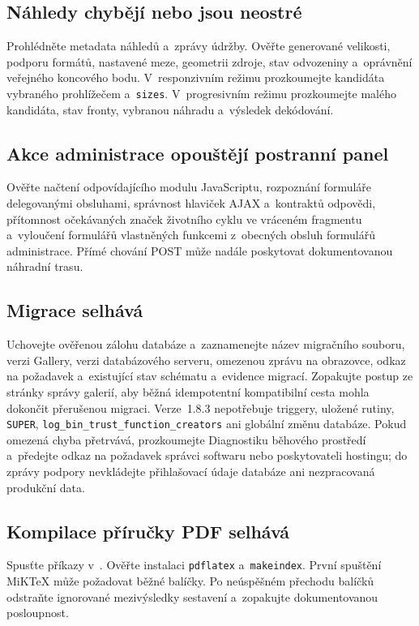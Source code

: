 \documentclass[11pt,a4paper]{article}
\newcommand{\version}{1.8.3}
\newcommand{\filepath}[1]{\path{#1}}
\newcommand{\codeword}[1]{\nolinkurl{#1}}
\begin{document}
\subsection{Náhledy chybějí nebo jsou neostré}

Prohlédněte metadata náhledů a~zprávy údržby. Ověřte generované velikosti,
podporu formátů, nastavené meze, geometrii zdroje, stav odvozeniny a~oprávnění
veřejného koncového bodu. V~responzivním režimu prozkoumejte kandidáta vybraného
prohlížečem a~\codeword{sizes}. V~progresivním režimu prozkoumejte malého
kandidáta, stav fronty, vybranou náhradu a~výsledek dekódování.

\subsection{Akce administrace opouštějí postranní panel}

Ověřte načtení odpovídajícího modulu JavaScriptu, rozpoznání formuláře
delegovanými obsluhami, správnost hlaviček AJAX a~kontraktů odpovědi, přítomnost
očekávaných značek životního cyklu ve vráceném fragmentu a~vyloučení formulářů
vlastněných funkcemi z~obecných obsluh formulářů administrace. Přímé chování
POST může nadále poskytovat dokumentovanou náhradní trasu.

\subsection{Migrace selhává}

Uchovejte ověřenou zálohu databáze a~zaznamenejte název migračního souboru,
verzi Gallery, verzi databázového serveru, omezenou zprávu na obrazovce, odkaz
na požadavek a~existující stav schématu a~evidence migrací. Zopakujte postup ze
stránky správy galerií, aby běžná idempotentní kompatibilní cesta mohla dokončit
přerušenou migraci. Verze~\version{} nepotřebuje triggery, uložené rutiny,
\codeword{SUPER}, \codeword{log\_bin\_trust\_function\_creators} ani globální
změnu databáze. Pokud omezená chyba přetrvává, prozkoumejte Diagnostiku běhového
prostředí a~předejte odkaz na požadavek správci softwaru nebo poskytovateli
hostingu; do zprávy podpory nevkládejte přihlašovací údaje databáze ani
nezpracovaná produkční data.

\subsection{Kompilace příručky PDF selhává}

Spusťte příkazy v~\filepath{docs/LATEX_BUILD.md}. Ověřte instalaci
\codeword{pdflatex} a~\codeword{makeindex}. První spuštění MiKTeX může požadovat
běžné balíčky. Po neúspěšném přechodu balíčků odstraňte ignorované mezivýsledky
sestavení a~zopakujte dokumentovanou posloupnost.
\end{document}
